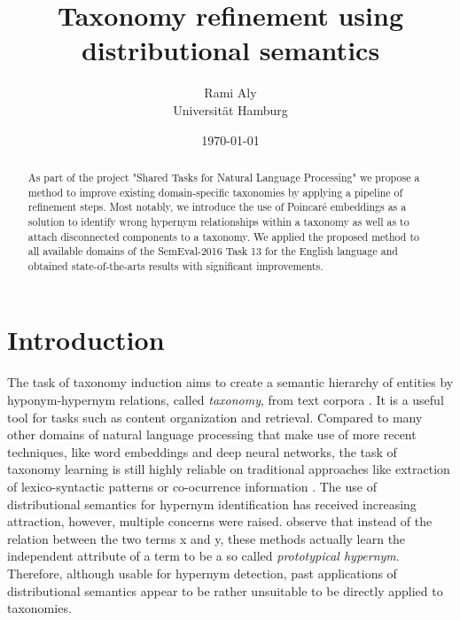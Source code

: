 \documentclass[12pt, headsepline, a4paper]{scrartcl}
\title{Taxonomy refinement using distributional semantics}
\author{Rami Aly \\ Universität Hamburg}
\date{\today}
\begin{document}
\maketitle
\begin{abstract}
As part of the project "Shared Tasks for Natural Language Processing" we propose a method to improve existing domain-specific taxonomies by applying a pipeline of refinement steps. Most notably, we introduce the use of Poincaré embeddings as a solution to identify wrong hypernym relationships within a taxonomy as well as to attach disconnected components to a taxonomy. We applied the proposed method  to all available domains of the SemEval-2016 Task 13 for the English language and obtained state-of-the-arts results with significant improvements.
\end{abstract}

\section{Introduction}
The task of taxonomy induction aims to create a semantic hierarchy of entities by hyponym-hypernym relations, called \emph{taxonomy}, from text corpora . It is a useful tool for tasks such as content organization and retrieval. Compared to many other domains of natural language processing that make use of more recent techniques, like word embeddings and deep neural networks, the task of taxonomy learning is still highly reliable on traditional approaches like extraction of lexico-syntactic patterns \citep{Hearst:1992:AAH:992133.992154} or co-ocurrence information \citep{grefenstette2015inriasac}. The use of distributional semantics \citep{mikolov2013distributed} for hypernym identification has received increasing attraction, however, multiple concerns were raised. \cite{levy2015supervised} observe that instead of the relation between the two terms x and y, these methods actually learn the independent attribute of a term to be a so called \emph{prototypical hypernym}. Therefore, although usable for hypernym detection, past applications of distributional semantics appear to be rather unsuitable to be directly applied to taxonomies. 
\end{document}

